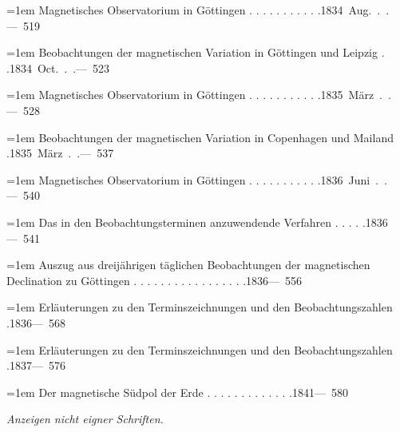 \noindent\hangindent=1em Magnetisches Observatorium in Göttingen . . . . . . . . . . .\unskip\hspace{1em plus 1fill}\mbox{1834 Aug. . .\quad — 519}\par\smallskip
\noindent\hangindent=1em Beobachtungen der magnetischen Variation in Göttingen und Leipzig . .\unskip\hspace{1em plus 1fill}\mbox{1834 Oct. . .\quad — 523}\par\smallskip
\noindent\hangindent=1em Magnetisches Observatorium in Göttingen . . . . . . . . . . .\unskip\hspace{1em plus 1fill}\mbox{1835 März . .\quad — 528}\par\smallskip
\noindent\hangindent=1em Beobachtungen der magnetischen Variation in Copenhagen und Mailand .\unskip\hspace{1em plus 1fill}\mbox{1835 März . .\quad — 537}\par\smallskip
\noindent\hangindent=1em Magnetisches Observatorium in Göttingen . . . . . . . . . . .\unskip\hspace{1em plus 1fill}\mbox{1836 Juni . .\quad — 540}\par\smallskip
\noindent\hangindent=1em Das in den Beobachtungsterminen anzuwendende Verfahren . . . . .\unskip\hspace{1em plus 1fill}\mbox{1836\quad — 541}\par\smallskip
\noindent\hangindent=1em Auszug aus dreijährigen täglichen Beobachtungen der magnetischen Declination zu Göttingen . . . . . . . . . . . . . . . . .\unskip\hspace{1em plus 1fill}\mbox{1836\quad — 556}\par\smallskip
\noindent\hangindent=1em Erläuterungen zu den Terminszeichnungen und den Beobachtungszahlen .\unskip\hspace{1em plus 1fill}\mbox{1836\quad — 568}\par\smallskip
\noindent\hangindent=1em Erläuterungen zu den Terminszeichnungen und den Beobachtungszahlen .\unskip\hspace{1em plus 1fill}\mbox{1837\quad — 576}\par\smallskip
\noindent\hangindent=1em Der magnetische Südpol der Erde . . . . . . . . . . . . .\unskip\hspace{1em plus 1fill}\mbox{1841\quad — 580}\par\smallskip
\par{}\medskip\noindent\textit{Anzeigen nicht eigner Schriften.}\par\smallskip
